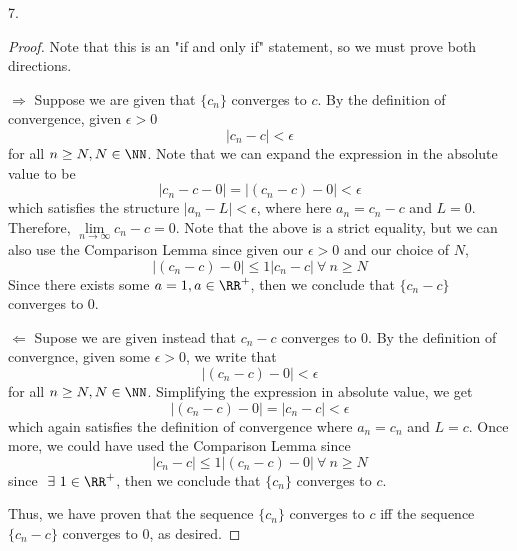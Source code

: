 \documentclass[12pt]{scrartcl}
\begin{document}
\newpage

7. 

\begin{proof}

\hfill

Note that this is an "if and only if" statement, so we must prove both directions.
  
$\Longrightarrow$ Suppose we are given that $\{c_n\}$ converges to $c$. By the definition of convergence, given $\epsilon > 0$
\[|c_n - c| < \epsilon\]
for all $n \geq N, N \in \NN$. Note that we can expand the expression in the absolute value to be 
\[|c_n - c - 0| = |(c_n - c) - 0| < \epsilon\]
which satisfies the structure $|a_n - L| < \epsilon$, where here $a_n = c_n - c$ and $L = 0$. 
Therefore, $\underset{n\to\infty}{\lim}c_n - c = 0$. Note that the above is a strict equality, 
but we can also use the Comparison Lemma since 
given our $\epsilon > 0$ and our choice of $N$, 
\[|(c_n - c) - 0| \leq 1|c_n - c| \ \forall \ n \geq N\]
Since there exists some $a = 1, a \in \RR^+$, then we conclude that $\{c_n - c\}$ converges to $0$.

\hfill

$\Longleftarrow$ Supose we are given instead that $c_n - c$ converges to $0$. By the definition of convergnce, 
given some $\epsilon > 0$, we write that 
\[|(c_n - c) - 0| < \epsilon\]
for all $n \geq N, N \in \NN$. Simplifying the expression in absolute value, we get 
\[|(c_n - c) - 0| = |c_n - c| < \epsilon\]
which again satisfies the definition of convergence where $a_n = c_n$ and $L = c$. Once more, 
we could have used the Comparison Lemma since 
\[|c_n - c| \leq 1|(c_n - c) - 0| \ \forall \ n \geq N\]
since $\ \exists \ 1 \in \RR^+$, then we conclude that $\{c_n\}$ converges to $c$. 

\hfill

Thus, we have proven that the sequence $\{c_n\}$ converges to $c$ iff the sequence $\{c_n - c\}$
converges to $0$, as desired.

\end{proof}
\end{document}
